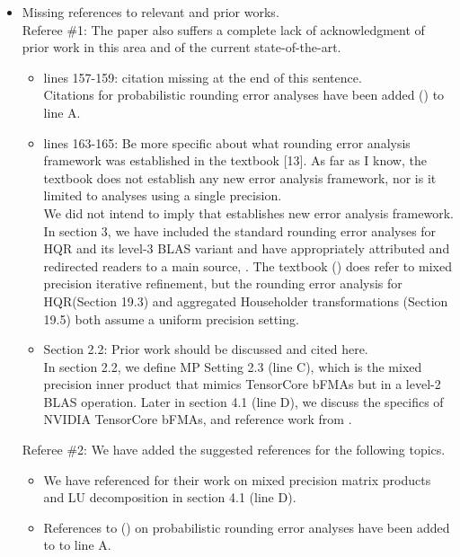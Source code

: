 \documentclass[10pt]{article}
\begin{document}
\begin{itemize}\bfseries
	\item Missing references to relevant and prior works.\\
	Referee \#1: The paper also suffers a complete lack of acknowledgment of prior work in this area and of the current state-of-the-art.
	\begin{itemize}\bfseries
		\item lines 157-159: citation missing at the end of this sentence. \\
		{\normalfont
		Citations for probabilistic rounding error analyses have been added (\cite{Higham2019a,Ipsen2019}) to line A. 
		}
		\item lines 163-165: Be more specific about what rounding error analysis framework was established in the textbook [13]. As far as I know, the textbook does not establish any new error analysis framework, nor is it limited to analyses using a single precision.\\
		{\normalfont
		We did not intend to imply that \cite{Higham2002} establishes new error analysis framework. 
		In section 3, we have included the standard rounding error analyses for HQR and its level-3 BLAS variant and have appropriately attributed and redirected readers to a main source, \cite{Higham2002}. 
		The textbook (\cite{Higham2002}) does refer to mixed precision iterative refinement, but the rounding error analysis for HQR(Section 19.3) and aggregated Householder transformations (Section 19.5) both assume a uniform precision setting. 
	    } 
		\item Section 2.2: Prior work should be discussed and cited here.\\
		{\normalfont
		In section 2.2, we define MP Setting 2.3 (line C), which is the mixed precision inner product that mimics TensorCore bFMAs but in a level-2 BLAS operation.
		Later in section 4.1 (line D), we discuss the specifics of NVIDIA TensorCore bFMAs, and reference work from \cite{Blanchard2019}. 
		}
	\end{itemize}
    Referee \#2: {\normalfont We have added the suggested references for the following topics.}
    \begin{itemize}\normalfont
    	\item We have referenced \cite{Blanchard2019} for their work on mixed precision matrix products and LU decomposition in section 4.1 (line D).
    	\item References to (\cite{Higham2019a,Ipsen2019}) on probabilistic rounding error analyses have been added to to line A. 

\end{itemize}
\end{itemize}
\end{document}
